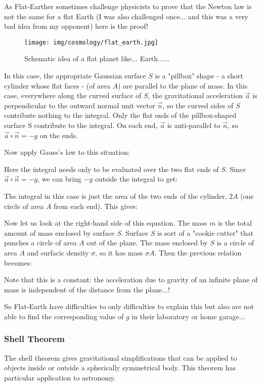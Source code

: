 	As Flat-Earther sometimes challenge physicists to prove that the Newton law is not the same for a flat Earth (I was also challenged once... and this was a very bad idea from my opponent) here is the proof!
	\begin{figure}[H]
		\centering
		\texttt{[image: img/cosmology/flat\_earth.jpg]}
		\caption[]{Schematic idea of a flat planet like... Earth......}
	\end{figure}
	In this case, the appropriate Gaussian surface $S$ is a "pillbox" shape - a short cylinder whose flat faces - (of area $A$) are parallel to the plane of mass. In this case, everywhere along the curved surface of $S$, the gravitational acceleration $\vec{a}$ is perpendicular to the outward normal unit vector $\vec{n}$, so the curved sides of $S$ contribute nothing to the integral. Only the flat ends of the pillbox-shaped surface S contribute to the integral. On each end, $\vec{a}$ is anti-parallel to $\vec{n}$, so $\vec{a}\circ\vec{n}=-g$ on the ends.
	
	Now apply Gauss's law to this situation:
	
	Here the integral needs only to be evaluated over the two flat ends of $S$. Since $\vec{a}\circ\vec{n}=-g$, we can bring $-g$ outside the integral to get:
	
	The integral in this case is just the area of the two ends of the cylinder, $2A$ (one circle of area $A$ from each end). This gives:
	
	Now let us look at the right-hand side of this equation. The mass $m$ is the total amount of mass enclosed by surface $S$. Surface $S$ is sort of a "cookie cutter" that punches a circle of area $A$ out of the plane. The mass
enclosed by $S$ is a circle of area $A$ and surfacic density $\sigma$, so it has mass $\sigma A$. Then the previous relation becomes:
	
	Note that this is a constant: the acceleration due to gravity of an infinite plane of mass is independent of the distance from the plane...!

	So Flat-Earth have difficulties to only difficulties to explain this but also are not able to find the corresponding value of $g$ in their laboratory or home garage...

	\subsubsection{Shell Theorem}
	The shell theorem gives gravitational simplifications that can be applied to objects inside or outside a spherically symmetrical body. This theorem has particular application to astronomy.

